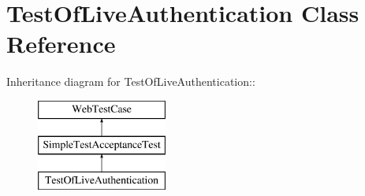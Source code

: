 \hypertarget{class_test_of_live_authentication}{
\section{TestOfLiveAuthentication Class Reference}
\label{class_test_of_live_authentication}
}
Inheritance diagram for TestOfLiveAuthentication::\begin{figure}[H]
\begin{center}
\leavevmode
\includegraphics[height=3cm]{class_test_of_live_authentication}
\end{center}
\end{figure}
